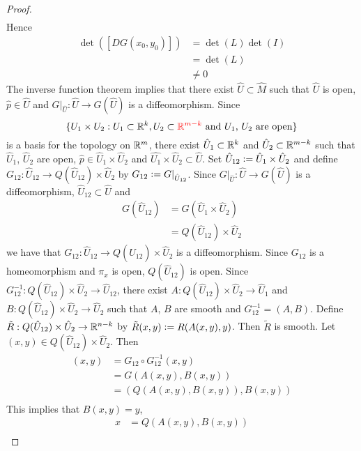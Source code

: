 \documentclass{book}
\begin{document}
\begin{proof}
\begin{align*}
		\end{align*}  
		Hence 
		\begin{align*}
			\det([D G (x_0, y_0)]) 
			& = \det(L) \det(I) \\
			& = \det(L) \\
			& \neq 0
		\end{align*}
		The inverse function theorem implies that there exist $\hat{U} \subset \hat{M}$ such that $\hat{U}$ is open, $\hat{p} \in \hat{U}$ and $G|_{\hat{U}}: \hat{U} \rightarrow G(\hat{U})$ is a diffeomorphism. Since 
		$$\{U_1 \times U_2: U_1 \subset \mathbb{R}^k, U_2 \subset \textcolor{red}{\mathbb{R}^{m-k} }\text{ and $U_1$, $U_2$ are open} \}$$ 
		is a basis for the topology on $\mathbb{R}^m$, there exist $\hat{U}_1 \subset \mathbb{R}^k$ and $\hat{U}_2 \subset \mathbb{R}^{m-k}$ such that $\hat{U}_1$, $\hat{U}_2$ are open, $\hat{p} \in \hat{U}_1 \times \hat{U}_2$ and $\hat{U_1} \times \hat{U}_2 \subset \hat{U}$. Set $\hat{U}_{12} \vcentcolon= \hat{U}_1 \times \hat{U}_2$ and define $G_{12} : \hat{U}_{12} \rightarrow Q(\hat{U}_{12}) \times \hat{U}_2$ by $G_{12} \vcentcolon= G|_{\hat{U}_{12}}$. Since $G|_{\hat{U}}: \hat{U} \rightarrow G(\hat{U})$ is a diffeomorphism, $\hat{U}_{12} \subset  \hat{U}$ and 
		\begin{align*}
			G(\hat{U}_{12})
			& = G(\hat{U}_1 \times \hat{U}_2) \\
			& = Q(\hat{U}_{12}) \times \hat{U}_2
		\end{align*}
		 we have that  $G_{12}: \hat{U}_{12} \rightarrow Q(\hat{U}_{12}) \times \hat{U}_2$ is a diffeomorphism. Since $G_{12}$ is a homeomorphism and $\pi_x$ is open, $Q(\hat{U}_{12})$ is open. Since $G_{12}^{-1}: Q(\hat{U}_{12}) \times \hat{U}_2 \rightarrow  \hat{U}_{12}$, there exist $A: Q(\hat{U}_{12}) \times \hat{U}_2 \rightarrow \hat{U}_1$ and $B: Q(\hat{U}_{12}) \times \hat{U}_2 \rightarrow \hat{U}_2$ such that $A$, $B$ are smooth and $G_{12}^{-1} = (A, B)$. Define $\tilde{R}: Q(\hat{U}_{12}) \times \hat{U}_2 \rightarrow \mathbb{R}^{n-k}$ by $\tilde{R}(x,y) \vcentcolon= R(A(x,y), y)$. Then $\tilde{R}$ is smooth. Let $(x,y) \in Q(\hat{U}_{12}) \times \hat{U}_2$. Then
		\begin{align*}
			(x,y)
			& = G_{12} \circ G_{12}^{-1}(x,y) \\
			& = G(A(x,y), B(x,y)) \\
			& = (Q(A(x,y), B(x,y)), B(x,y)) \\
		\end{align*}
		This implies that $B(x,y) = y$, 
		\begin{align*}
			x
			& = Q(A(x,y), B(x,y)) \\

\end{align*}
\end{proof}
\end{document}
